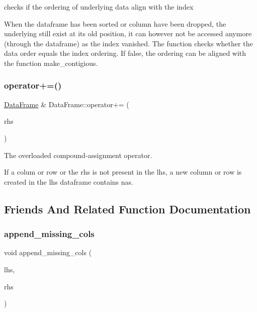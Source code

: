 checks if the ordering of underlying data align with the index 

When the dataframe has been sorted or column have been dropped, the underlying still exist at its old position, it can however not be accessed anymore (through the dataframe) as the index vanished. The function checks whether the data order equals the index ordering. If false, the ordering can be aligned with the function {\ttfamily make\+\_\+contigious}. \mbox{\label{classDataFrame_a61f3301cc72548b4b3536c0844fb156d}} 
\subsubsection{\texorpdfstring{operator+=()}{operator+=()}}
{\footnotesize\ttfamily \hyperlink{classDataFrame}{Data\+Frame} \& Data\+Frame\+::operator+= (\begin{DoxyParamCaption}\item[{const \hyperlink{classDataFrame}{Data\+Frame} \&}]{rhs }\end{DoxyParamCaption})}



The overloaded compound-\/assignment operator. 

If a colum or row or the rhs is not present in the lhs, a new column or row is created in the lhs dataframe contains nas. 

\subsection{Friends And Related Function Documentation}
\mbox{\label{classDataFrame_a27cc8acd51a5cd40e6a2726368914661}} 
\subsubsection{\texorpdfstring{append\+\_\+missing\+\_\+cols}{append\_missing\_cols}}
{\footnotesize\ttfamily void append\+\_\+missing\+\_\+cols (\begin{DoxyParamCaption}\item[{\hyperlink{classDataFrame}{Data\+Frame} \&}]{lhs,  }\item[{const \hyperlink{classDataFrame}{Data\+Frame} \&}]{rhs }\end{DoxyParamCaption})\hspace{0.3cm}{\ttfamily [friend]}}



